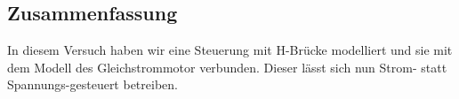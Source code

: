 \subsection{Zusammenfassung}

In diesem Versuch haben wir eine Steuerung mit H-Brücke modelliert und
sie mit dem Modell des Gleichstrommotor verbunden. Dieser lässt sich nun
Strom- statt Spannungs-gesteuert betreiben.